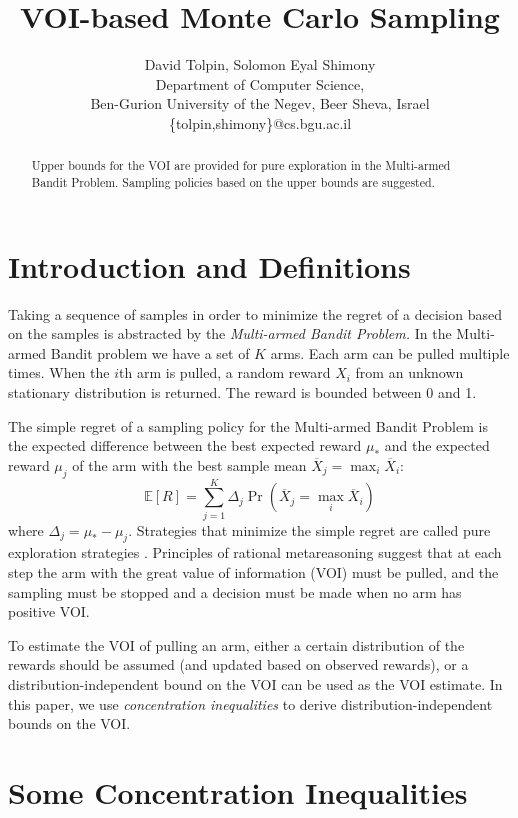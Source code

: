 \documentclass{article}
\title{VOI-based Monte Carlo Sampling}
\author {David Tolpin, Solomon Eyal Shimony \\
Department of Computer Science, \\
Ben-Gurion University of the Negev, Beer Sheva, Israel \\
\{tolpin,shimony\}@cs.bgu.ac.il}
\newcommand {\IE} {\ensuremath {\mathbb{E}}}
\begin{document}
\maketitle

\begin{abstract}
Upper bounds for the VOI are provided for pure exploration in the
Multi-armed Bandit Problem. Sampling policies based on the upper
bounds are suggested.
\end{abstract}

\section{Introduction and Definitions}

Taking a sequence of samples in order to minimize the
regret of a decision based on the samples is abstracted by the
{\em Multi-armed Bandit Problem.} In the Multi-armed Bandit problem
we have a set of $K$ arms. Each arm can be pulled multiple
times. When the $i$th arm is pulled, a random reward $X_i$ from an
unknown stationary distribution is returned.  The reward is bounded
between 0 and 1.

The simple regret of a sampling policy for the Multi-armed Bandit
Problem is the expected difference between the best expected reward
$\mu_*$ and the expected reward $\mu_j$ of the arm with the best sample mean
$\overline X_j=\max_i\overline X_i$:
\begin{equation}
\label{eq:simple-regret}
\IE[R]=\sum_{j=1}^K\Delta_j\Pr(\overline X_j=\max_i\overline X_i)
\end{equation}
where $\Delta_j=\mu_*-\mu_j$.
Strategies that minimize the simple regret are called pure exploration
strategies \cite{Bubeck.pure}. Principles of rational metareasoning
\cite{Russel.right} suggest that at each step the arm with the great
value of information (VOI) must be pulled, and the sampling must be
stopped and a decision must be made when no arm has positive VOI. 

To estimate the VOI of pulling an arm, either a certain 
distribution of the rewards should be assumed (and updated based on
observed rewards), or a distribution-independent bound on the VOI can be
used as the VOI estimate. In this paper, we use {\em concentration inequalities}
to derive distribution-independent bounds on the VOI.

\section{Some Concentration Inequalities}
\end{document}
